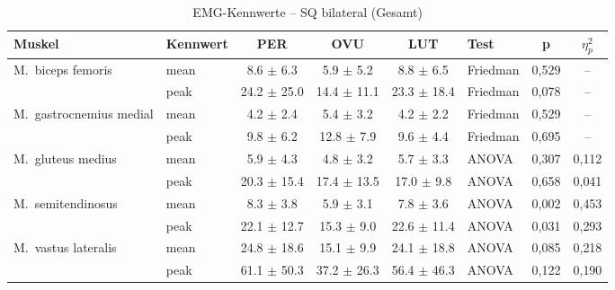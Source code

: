 \begin{table}[H]
  \centering
  \caption{EMG-Kennwerte – SQ bilateral (Gesamt)}
  \label{tab:SQ_bilateral_Gesamt}
  \small
  \begin{tabular}{l l c c c l c c}
    \hline
    \textbf{Muskel} & \textbf{Kennwert} & \textbf{PER} & \textbf{OVU} & \textbf{LUT} & \textbf{Test} & \textbf{p} & \textbf{$\eta^2_p$} \\
    \hline
    M.~biceps femoris & mean & 8.6 $\pm$ 6.3 & 5.9 $\pm$ 5.2 & 8.8 $\pm$ 6.5 & Friedman & 0{,}529 & -- \\
     & peak & 24.2 $\pm$ 25.0 & 14.4 $\pm$ 11.1 & 23.3 $\pm$ 18.4 & Friedman & 0{,}078 & -- \\
    \hline
    M.~gastrocnemius medial & mean & 4.2 $\pm$ 2.4 & 5.4 $\pm$ 3.2 & 4.2 $\pm$ 2.2 & Friedman & 0{,}529 & -- \\
     & peak & 9.8 $\pm$ 6.2 & 12.8 $\pm$ 7.9 & 9.6 $\pm$ 4.4 & Friedman & 0{,}695 & -- \\
    \hline
    M.~gluteus medius & mean & 5.9 $\pm$ 4.3 & 4.8 $\pm$ 3.2 & 5.7 $\pm$ 3.3 & ANOVA & 0{,}307 & 0{,}112 \\
     & peak & 20.3 $\pm$ 15.4 & 17.4 $\pm$ 13.5 & 17.0 $\pm$ 9.8 & ANOVA & 0{,}658 & 0{,}041 \\
    \hline
    M.~semitendinosus & mean & 8.3 $\pm$ 3.8 & 5.9 $\pm$ 3.1 & 7.8 $\pm$ 3.6 & ANOVA & 0{,}002 & 0{,}453 \\
     & peak & 22.1 $\pm$ 12.7 & 15.3 $\pm$ 9.0 & 22.6 $\pm$ 11.4 & ANOVA & 0{,}031 & 0{,}293 \\
    \hline
    M.~vastus lateralis & mean & 24.8 $\pm$ 18.6 & 15.1 $\pm$ 9.9 & 24.1 $\pm$ 18.8 & ANOVA & 0{,}085 & 0{,}218 \\
     & peak & 61.1 $\pm$ 50.3 & 37.2 $\pm$ 26.3 & 56.4 $\pm$ 46.3 & ANOVA & 0{,}122 & 0{,}190 \\
    \hline
  \end{tabular}
\end{table}

